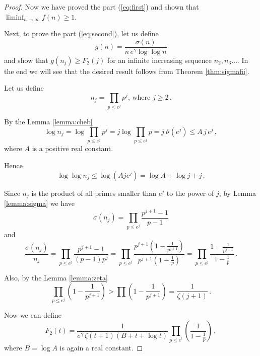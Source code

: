 \documentclass{article}
\begin{document}
\begin{theorem}
\begin{proof}
Now we have proved the part (\ref{eq:first}) and shown that
$\liminf_{n \rightarrow \infty}{f(n)}\geq 1$.

Next, to prove the part (\ref{eq:second}), let us define
\begin{equation*}
    g(n)=\frac{\sigma(n)}{n\,e^\gamma \log\log n}
\end{equation*}
and show that $g(n_j) \geq F_2(j)$ for an infinite increasing sequence $n_2,n_3\dots$. In the end we will see that the desired result follows from Theorem \ref{thm:sigmafii}.

Let us define
\begin{equation*}
    n_j=\prod_{p\leq e^j} p^j\text{, where } j\geq 2\,.
\end{equation*}

By the Lemma \ref{lemma:cheb}
\begin{equation*}
    \log n_j = \log \prod_{p\leq e^j} p^j = j \log \prod_{p\leq e^j} p = j\,\vartheta(e^j) \leq A\,j\,e^j\,,
\end{equation*}
where $A$ is a positive real constant.

Hence
\begin{equation*}
\label{eq:lognj}
    \log \log n_j \leq \log (Aje^j) = \log A + \log j + j\,.
\end{equation*}

Since $n_j$ is the product of all primes smaller than $e^j$ to the power of $j$, by Lemma \ref{lemma:sigma} we have
\begin{equation*}
    \sigma(n_j) = \prod_{p\leq e^j} \frac{p^{j+1}-1}{p-1}
\end{equation*}
and
\begin{equation*}
    \frac{\sigma(n_j)}{n_j} = \prod_{p\leq e^j} \frac{p^{j+1}-1}{(p-1)p^j} = \prod_{p\leq e^j} \frac{p^{j+1}\left(1-\frac{1}{p^{j+1}}\right)}{p^{j+1}\left(1-\frac{1}{p}\right)} = \prod_{p\leq e^j} \frac{1-\frac{1}{p^{j+1}}}{1-\frac{1}{p}}\,.
\end{equation*}

Also, by the Lemma \ref{lemma:zeta}
\begin{equation*}
    \prod_{p\leq e^j}\left(1-\frac{1}{p^{j+1}}\right) > \prod \left(1-\frac{1}{p^{j+1}}\right) = \frac{1}{\zeta(j+1)}\,.
\end{equation*}

Now we can define
\begin{equation*}
    F_2(t)=\frac{1}{e^\gamma\,\zeta(t+1)(B+t+\log t)} \prod_{p\leq e^t} \left(\frac{1}{1-\frac{1}{p}}\right)\,,
\end{equation*}
where $B=\log A$ is again a real constant.


\end{proof}
\end{theorem}
\end{document}
